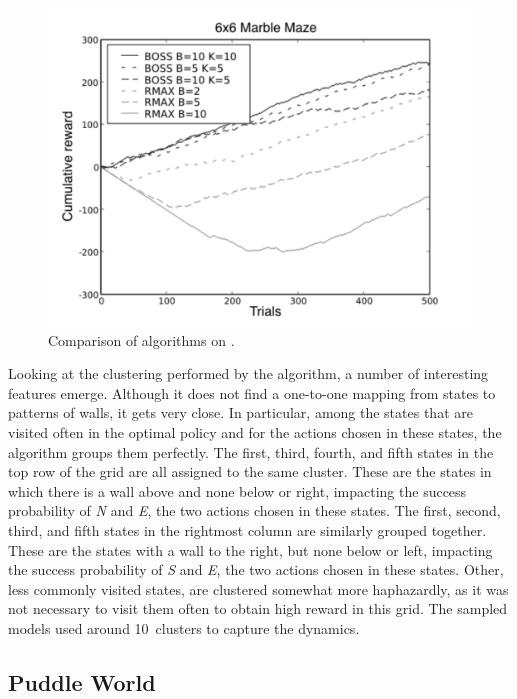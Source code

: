 \begin{figure}[t]
\begin{center}
\includegraphics[width=1.0\linewidth]{marblemaze}
\caption{Comparison of algorithms on .}
\label{f:marblegraph}
\end{center}
\end{figure}

Looking at the clustering performed by the algorithm, a number of
interesting features emerge.  Although it does not find a one-to-one
mapping from states to patterns of walls, it gets very close.  In
particular, among the states that are visited often in the optimal
policy and for the actions chosen in these states, the algorithm
groups them perfectly.  The first, third, fourth, and fifth states in
the top row of the grid are all assigned to the same cluster.  These
are the states in which there is a wall above and none below or right,
impacting the success probability of \emph{N} and \emph{E}, the two actions
chosen in these states.  The first, second, third, and fifth states in
the rightmost column are similarly grouped together.  These are the
states with a wall to the right, but none below or left, impacting the
success probability of \emph{S} and \emph{E}, the two actions chosen in these
states.  Other, less commonly visited states, are clustered somewhat
more haphazardly,
as it was not necessary to visit them often to
obtain high reward in this grid.  The sampled models used around
10~clusters to capture the dynamics.

\subsection{Puddle World}
\label{puddle}

